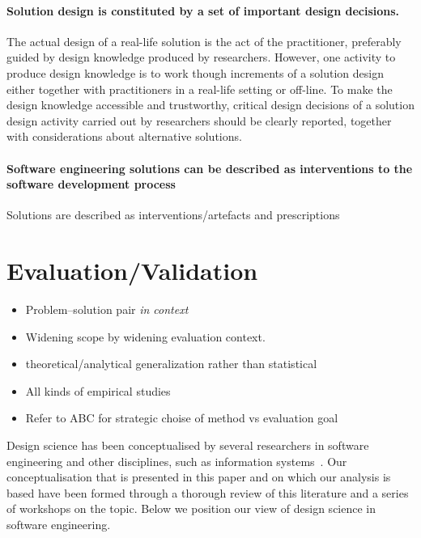 \documentclass[graybox]{svmult}
\begin{document}
\paragraph{Solution design is constituted by a set of important design decisions.}  The actual design of a real-life solution is the act of the practitioner, preferably guided by design knowledge produced by researchers. However, one activity to produce design knowledge is to work though increments of a solution design either together with practitioners in a real-life setting or off-line. To make the design knowledge accessible and trustworthy, critical design decisions of a solution design activity carried out by researchers should be clearly reported, together with considerations about alternative solutions. 

\paragraph{Software engineering solutions can be described as interventions to the software development process}
Solutions are described as interventions/artefacts and prescriptions



\section{Evaluation/Validation}
\begin{itemize}
\item Problem--solution pair \emph{in context}
\item Widening scope by widening evaluation context. 
\item theoretical/analytical generalization rather than statistical 
\item All kinds of empirical studies \cite{easterbrook_selecting_2008}\cite{Runeson12Case,WohlinExpBook12}
\item Refer to ABC \cite{StolABC18} for strategic choise of method vs evaluation goal
\end{itemize}



Design science has been conceptualised by several researchers in software engineering and other disciplines, such as information systems~\cite{gregor_positioning_2013}. Our conceptualisation that is presented in this paper and on which our analysis is based have been formed through a thorough review of this literature and a series of workshops on the topic. Below we position our view of design science in software engineering.
\end{document}
